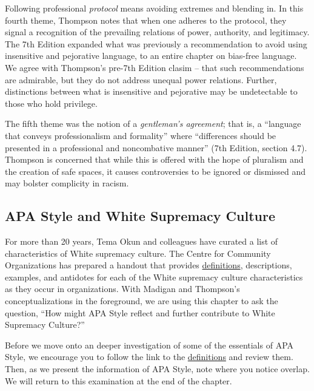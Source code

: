 \documentclass[
  11pt,
]{book}
\begin{document}
Following professional \emph{protocol} means avoiding extremes and blending in. In this fourth theme, Thompson \citeyearpar{thompson_gentlemanly_2004} notes that when one adheres to the protocol, they signal a recognition of the prevailing relations of power, authority, and legitimacy. The 7th Edition expanded what was previously a recommendation to avoid using insensitive and pejorative language, to an entire chapter on bias-free language. We agree with Thompson's pre-7th Edition clasim -- that such recommendations are admirable, but they do not address unequal power relations. Further, distinctions between what is insensitive and pejorative may be undetectable to those who hold privilege.

The fifth theme was the notion of a \emph{gentleman's agreement}; that is, a ``language that conveys professionalism and formality'' where ``differences should be presented in a professional and noncombative manner'' (7th Edition, section 4.7). Thompson \citeyearpar{thompson_gentlemanly_2004} is concerned that while this is offered with the hope of pluralism and the creation of safe spaces, it causes controversies to be ignored or dismissed and may bolster complicity in racism.

\hypertarget{apa-style-and-white-supremacy-culture}{%
\subsection{APA Style and White Supremacy Culture}\label{apa-style-and-white-supremacy-culture}}

For more than 20 years, Tema Okun \citep{noauthor_white_nodate, okun_white_2021} and colleagues have curated a list of characteristics of White supremacy culture. The Centre for Community Organizations has prepared a handout that provides \href{https://coco-net.org/wp-content/uploads/2019/11/Coco-WhiteSupCulture-ENG4.pdf}{definitions}, descriptions, examples, and antidotes for each of the White supremacy culture characteristics as they occur in organizations. With Madigan \citeyearpar{madigan_language_1995} and Thompson's \citeyearpar{thompson_gentlemanly_2004} conceptualizations in the foreground, we are using this chapter to ask the question, ``How might APA Style reflect and further contribute to White Supremacy Culture?''

Before we move onto an deeper investigation of some of the essentials of APA Style, we encourage you to follow the link to the \href{https://coco-net.org/wp-content/uploads/2019/11/Coco-WhiteSupCulture-ENG4.pdf}{definitions} and review them. Then, as we present the information of APA Style, note where you notice overlap. We will return to this examination at the end of the chapter.
\end{document}

